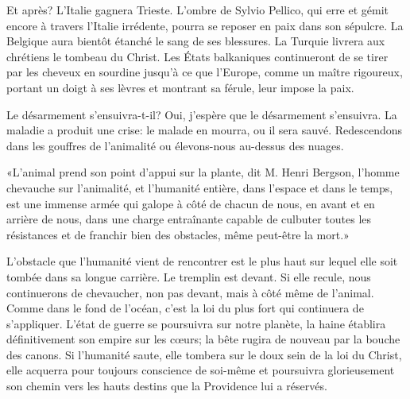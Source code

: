 \begin{chapter}{Et après?}
L'Italie gagnera Trieste. L'ombre de Sylvio Pellico, qui erre et gémit
encore à travers l'Italie irrédente, pourra se reposer en paix dans son
sépulcre. La Belgique aura bientôt étanché le sang de ses blessures. La
Turquie livrera aux chrétiens le tombeau du Christ. Les États
balkaniques continueront de se tirer par les cheveux en sourdine jusqu'à
ce que l'Europe, comme un maître rigoureux, portant un doigt à ses
lèvres et montrant sa férule, leur impose la paix.

Le désarmement s'ensuivra-t-il? Oui, j'espère que le désarmement
s'ensuivra. La maladie a produit une crise: le malade en mourra, ou il
sera sauvé. Redescendons dans les gouffres de l'animalité ou
élevons-nous au-dessus des nuages.

«L'animal prend son point d'appui sur la plante, dit M. Henri Bergson,
l'homme chevauche sur l'animalité, et l'humanité entière, dans l'espace
et dans le temps, est une immense armée qui galope à côté de chacun de
nous, en avant et en arrière de nous, dans une charge entraînante
capable de culbuter toutes les résistances et de franchir bien des
obstacles, même peut-être la mort.»

L'obstacle que l'humanité vient de rencontrer est le plus haut sur
lequel elle soit tombée dans sa longue carrière. Le tremplin est devant.
Si elle recule, nous continuerons de chevaucher, non pas devant, mais à
côté même de l'animal. Comme dans le fond de l'océan, c'est la loi du
plus fort qui continuera de s'appliquer. L'état de guerre se poursuivra
sur notre planète, la haine établira définitivement son empire sur les
cœurs; la bête rugira de nouveau par la bouche des canons. Si
l'humanité saute, elle tombera sur le doux sein de la loi du Christ,
elle acquerra pour toujours conscience de soi-même et poursuivra
glorieusement son chemin vers les hauts destins que la Providence lui a
réservés.

\end{chapter}